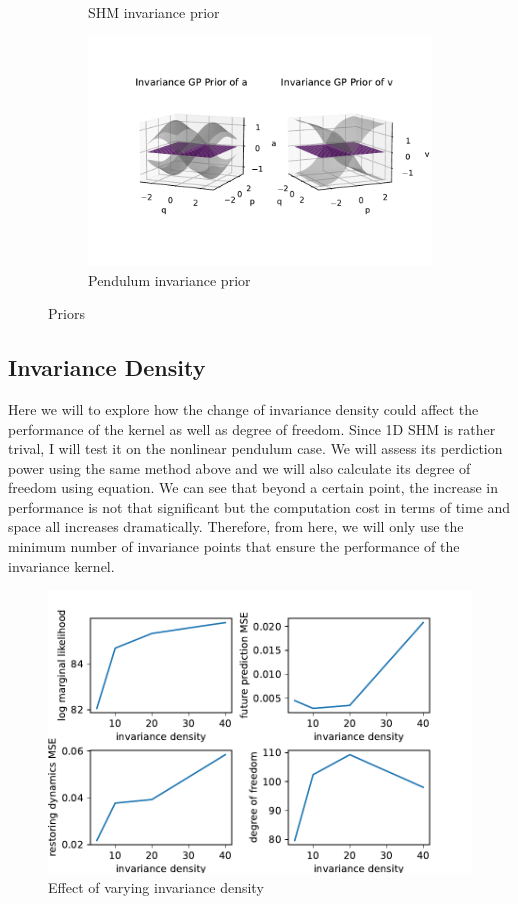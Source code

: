 \documentclass{statsmsc}
\begin{document}
\begin{figure}[H]
\begin{subfigure}[b]{0.5\linewidth}
         \caption{SHM invariance prior}
         \label{fig:prior_shm_invariance}
     \end{subfigure}
     \hfill
     \begin{subfigure}[b]{0.5\linewidth}
         \centering
         \includegraphics[width=\linewidth]{../codes/figures/prior_pendulum_invariance.pdf}
         \caption{Pendulum invariance prior}
         \label{fig:prior_pendulum_invariance}
     \end{subfigure}
        \caption{Priors}
        \label{fig:priors}
\end{figure}

\subsection{Invariance Density}
Here we will to explore how the change of invariance density could affect the performance of the kernel as well as degree of freedom.
Since 1D SHM is rather trival, I will test it on the nonlinear pendulum case. 
We will assess its perdiction power using the same method above and we will also calculate its degree of freedom using equation.
We can see that beyond a certain point, the increase in performance is not that significant but the computation cost in terms of time and space all increases dramatically.
Therefore, from here, we will only use the minimum number of invariance points that ensure the performance of the invariance kernel. 

\begin{figure}[H] 
  \includegraphics[width=0.6\linewidth]{../codes/figures/vary_invariance_density.pdf}
  \centering
  \caption{Effect of varying invariance density}
  \label{fig:vary_invariance_density}
\end{figure}
\end{document}
